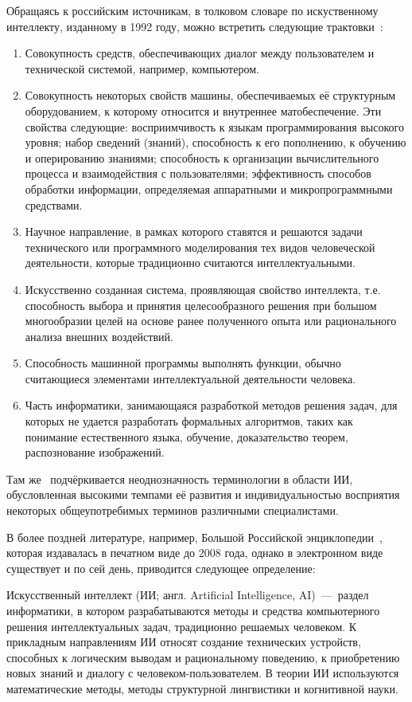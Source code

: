 Обращаясь к российским источникам, в толковом словаре по искуственному интеллекту, изданному в 1992 году, можно встретить следующие трактовки~\cite[с.~247]{aidict}:
\begin{enumerate}
	\item Совокупность средств, обеспечивающих диалог между пользователем и технической системой, например, компьютером. 
	\item Совокупность некоторых свойств машины, обеспечиваемых её структурным оборудованием, к которому относится и внутреннее матобеспечение. Эти свойства следующие: восприимчивость к языкам программирования высокого уровня; набор сведений (знаний), способность к его пополнению, к обучению и оперированию знаниями; способность к организации вычислительного процесса и взаимодействия с пользователями; эффективность способов обработки информации, определяемая аппаратными и микропрограммными средствами. 
	\item Научное направление, в рамках которого ставятся и решаются задачи технического или программного моделирования тех видов человеческой деятельности, которые традиционно считаются интеллектуальными.
	\item Искусственно созданная система, проявляющая свойство 
	интеллекта, т.е. способность выбора и принятия целесообразного решения при большом многообразии целей на основе ранее полученного опыта или рационального анализа внешних воздействий.
	\item Способность машинной программы выполнять функции, обычно считающиеся элементами интеллектуальной деятельности человека. 
	\item Часть информатики, занимающаяся разработкой методов решения задач, для которых не удается разработать формальных алгоритмов, таких как понимание естественного языка, обучение, доказательство теорем, распознование изображений.
\end{enumerate}

Там же~\cite[с.~245]{aidict} подчёркивается неоднозначность терминологии в области ИИ, обусловленная высокими темпами её развития и индивидуальностью восприятия некоторых общеупотребимых терминов различными специалистами.

В более поздней литературе, например, Большой Российской энциклопедии~\cite{bre11}, которая издавалась в печатном виде до 2008 года, однако в электронном виде существует и по сей день, приводится следующее определение: 

Искусственный интеллект (ИИ; англ. Artificial Intelligence, AI)~---~раздел информатики, в котором разрабатываются методы и средства компьютерного решения интеллектуальных задач, традиционно решаемых человеком. К прикладным направлениям ИИ относят создание технических устройств, способных к логическим выводам и рациональному поведению, к приобретению новых знаний и диалогу с человеком-пользователем. В теории ИИ используются математические методы, методы структурной лингвистики и когнитивной науки. 

